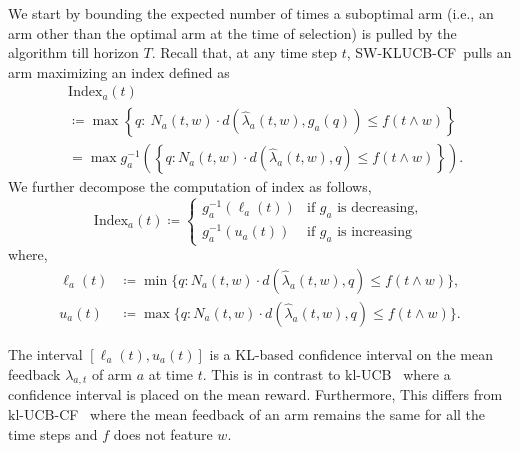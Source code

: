 \documentclass[letterpaper]{article} %
\newcommand{\defined}{\coloneqq}
\newcommand{\KLUCBCF}{$\mathrm{kl}$-\textsc{UCB-CF}}
\newcommand{\SWKLUCBCF}{\textsc{SW-KLUCB-CF}}
\newcommand{\KLUCB}{$\mathrm{kl}$-\textsc{UCB}}
\newcommand{\meanFeedback}[2]{\lambda_{#1, #2}}
\newcommand{\windowsize}{w}
\begin{document}
We start by bounding the expected number of times a suboptimal arm (i.e., an arm other than the optimal arm at the time of selection) is pulled by the algorithm till horizon $T$. Recall that, at any time step $t$, \SWKLUCBCF \ pulls an arm maximizing an index defined as
\begin{align*}
& \mathrm{Index}_a(t) \\
&\defined \max \left\{ q:\  N_a(t, \windowsize)\cdot{}d\left(\hat{\lambda}_a(t, \windowsize), g_a(q)\right) \leq f\left(t \wedge \windowsize\right) \right\} \\
&= \max g_a^{-1}\left( \left\{q: N_a(t, \windowsize)\cdot{}d\left(\hat{\lambda}_a(t, \windowsize), q\right) \leq f\left(t \wedge \windowsize\right)\right\} \right).
\end{align*}
We further decompose the computation of index as follows,
$$\mathrm{Index}_a(t) \defined
\begin{cases}
g_a^{-1}({\ell_a(t)}) & \text{if } g_a \text{ is decreasing}, \\
g_a^{-1}({u_a(t)}) & \text{if } g_a \text{ is increasing}
\end{cases}
$$
where,
\begin{align*}
\ell_a(t)  &\defined  \min \Big\{q: N_a(t, \windowsize)\cdot{}d\left(\hat{\lambda}_a(t, \windowsize), q\right) \leq f\left( t \wedge \windowsize \right)\Big\}, \\
u_a(t)  &\defined  \max \Big\{q: N_a(t, \windowsize)\cdot{}d\left(\hat{\lambda}_a(t, \windowsize), q\right) \leq f\left( t \wedge\windowsize \right) \Big\}.
\end{align*}

\vspace{-2.33mm}
The interval $[\ell_a(t), u_a(t)]$ is a KL-based confidence interval on the mean feedback $\meanFeedback{a}{t}$ of arm $a$ at time $t$.
This is in contrast to \KLUCB\ \citep{KLUCBJournal} where a confidence interval is placed on the mean reward. Furthermore,
This differs from \KLUCBCF \ \cite{pmlr-v83-gajane18a} where the mean feedback of an arm remains the same for all the time steps and $f$ does not feature $\windowsize$.
\end{document}
